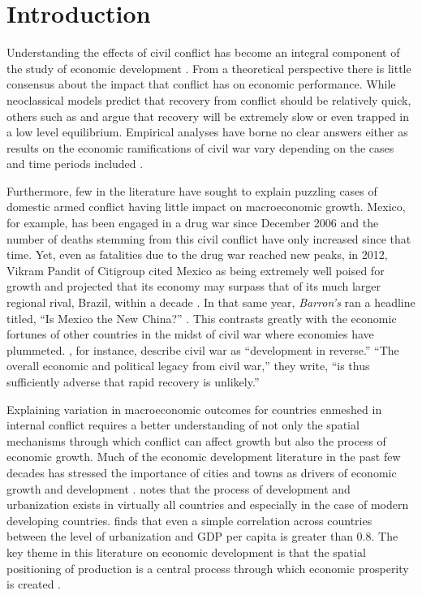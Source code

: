 
\section{Introduction}
\label{intro}

Understanding the effects of civil conflict has become an integral component of the study of economic development \citep{serneels:verpoorten:2013}. From a theoretical perspective there is little consensus about the impact that conflict has on economic performance. While neoclassical models predict that recovery from conflict should be relatively quick, others such as \citet{barro:martin:2004} and \citet{sachs:2006} argue that recovery will be extremely slow or even trapped in a low level equilibrium. Empirical analyses have borne no clear answers either as results on the economic ramifications of civil war vary depending on the cases and time periods included \citep{kang:meernik:2005}. 

Furthermore, few in the literature have sought to explain puzzling cases of domestic armed conflict having little impact on macroeconomic growth. Mexico, for example, has been engaged in a drug war since December 2006 and the number of deaths stemming from this civil conflict have only increased since that time. Yet, even as fatalities due to the drug war reached new peaks, in 2012, Vikram Pandit of Citigroup cited Mexico as being extremely well poised for growth and projected that its economy may surpass that of its much larger regional rival, Brazil, within a decade \citep{vardi:2012}. In that same year, \emph{Barron's} ran a headline titled, ``Is Mexico the New China?'' \citep{kapadia:2012}. This contrasts greatly with the economic fortunes of other countries in the midst of civil war where economies have plummeted. \cite{collier:elliott:etal:2003}, for instance, describe civil war as ``development in reverse.'' ``The overall economic and political legacy from civil war,'' they write, ``is thus sufficiently adverse that rapid recovery is unlikely.''  

Explaining variation in macroeconomic outcomes for countries enmeshed in internal conflict requires a better understanding of not only the spatial mechanisms through which conflict can affect growth but also the process of economic growth. Much of the economic development literature in the past few decades has stressed the importance of cities and towns as drivers of economic growth and development \citep{hanson:2005}. \citet{venables:2005} notes that the process of development and urbanization exists in virtually all countries and especially in the case of modern developing countries. \citet{henderson:2000} finds that even a simple correlation across countries between the level of urbanization and GDP per capita is greater than 0.8. The key theme in this literature on economic development is that the spatial positioning of production is a central process through which economic prosperity is created \citep{krugman:1991}.

